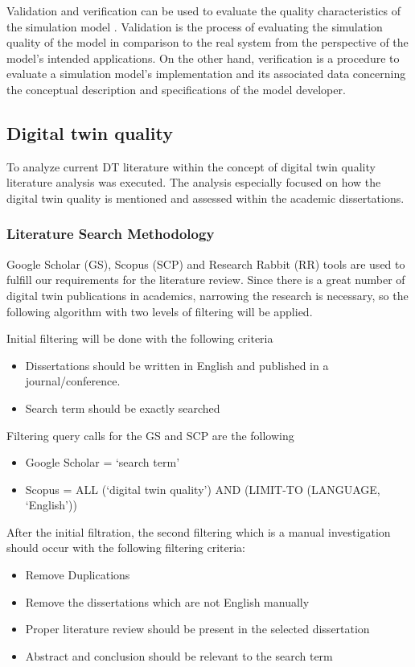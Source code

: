\documentclass[9pt,conference]{IEEEtran}
\begin{document}
    Validation and verification can be used to evaluate the quality characteristics of the simulation model \cite{StewartSimulation} \cite{VerificationValidationSergent} \cite{OsmanBalci}. 
    Validation is the process of evaluating the simulation quality of the model in comparison to the real system from the perspective of the model's intended applications. 
    On the other hand, verification is a procedure to evaluate a simulation model's implementation and its associated data concerning the conceptual description and specifications of the model developer. 

    \subsection*{Digital twin quality}
    To analyze current DT literature within the concept of digital twin quality literature analysis was executed. 
    The analysis especially focused on how the digital twin quality is mentioned and assessed within the academic dissertations.

    \subsubsection*{Literature Search Methodology}
    Google Scholar (GS), Scopus (SCP) and Research Rabbit (RR) tools are used to fulfill our requirements for the literature review. Since there is a great number of digital twin publications in academics,
    narrowing the research is necessary, so the following algorithm with two levels of filtering will be applied.

    Initial filtering will be done with the following criteria
    \begin{itemize}
        \item  Dissertations should be written in English and published in a journal/conference.
        \item  Search term should be exactly searched
    \end{itemize}

    Filtering query calls for the GS and SCP are the following
    \begin{itemize}
        \item Google Scholar = `search term'
        \item Scopus = ALL (`digital twin quality') AND (LIMIT-TO (LANGUAGE, `English'))
    \end{itemize}
    After the initial filtration, the second filtering which is a manual investigation should occur with the following filtering criteria:
    \begin{itemize}
        \item  Remove Duplications
        \item  Remove the dissertations which are not English manually
        \item  Proper literature review should be present in the selected dissertation
        \item  Abstract and conclusion should be relevant to the search term
    \end{itemize}
\end{document}

